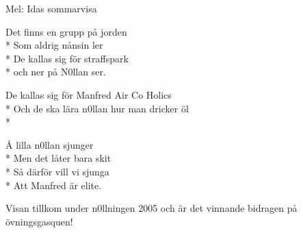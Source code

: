 \begin{SongText}
    \begin{SongInfo}
        Mel: Idas sommarvisa
    \end{SongInfo}
    \begin{SongVerse}
        Det finns en grupp på jorden\\*%
        Som aldrig nånsin ler\\*%
        De kallas sig för straffspark\\*%
        och ner på N0llan ser.
    \end{SongVerse}
    \begin{SongVerse}
        De kallas sig för Manfred Air Co Holics\\*%
        Och de ska lära n0llan hur man dricker öl\\*%
    \end{SongVerse}
    \begin{SongVerse}
        Å lilla n0llan sjunger\\*%
        Men det låter bara skit\\*%
        Så därför vill vi sjunga\\*%
        Att Manfred är elite.
    \end{SongVerse}
    \begin{SongInfo}
        Visan tillkom under n0llningen 2005 och är det vinnande bidragen på övningsgasquen!
    \end{SongInfo}
\end{SongText}

